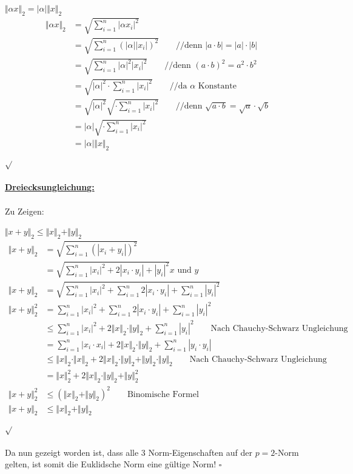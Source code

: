 \documentclass{llncs}
\begin{document}
$\Vert \alpha x \Vert_2=|\alpha | \Vert x \Vert_2$\\
\begin{align*}
\Vert\alpha x \Vert_2 
&=\sqrt{ \sum^n_{i=1} |\alpha x_i|^2}\\
&=\sqrt{ \sum^n_{i=1} (|\alpha| |x_i|)^2} \quad\quad\text{//denn  }|a\cdot b|=|a| \cdot |b| \\
&=\sqrt{ \sum^n_{i=1} |\alpha|^2 |x_i|^2}\quad\quad\text{//denn  }(a\cdot b)^2=a^2 \cdot b^2 \\
&=\sqrt{|\alpha|^2 \cdot \sum^n_{i=1} |x_i|^2}\quad\quad\text{//da }\alpha \text{ Konstante}\\
&=\sqrt{|\alpha|^2} \sqrt{\cdot \sum^n_{i=1} |x_i|^2}\quad\quad\text{//denn  } \sqrt{a\cdot b}=\sqrt{a} \cdot \sqrt{b} \\
&=|\alpha| \sqrt{\cdot \sum^n_{i=1} |x_i|^2}\\
&=|\alpha| \Vert x \Vert_2 
\end{align*} \hfill$\sqrt{}$\\\\
\underline{\textbf{Dreiecksungleichung:}}\\\\
Zu Zeigen:

$\Vert x+y \Vert_2\le\Vert x \Vert_2 + \Vert y \Vert_2$\\
\begin{align*}
\Vert x+y \Vert_2
&= \sqrt{ \sum^n_{i=1} (|x_i+y_i|)^2}\\
&=\sqrt{ \sum^n_{i=1} |x_i|^2+2| x_i\cdot y_i|+|y_i|^2}  x \text{ und } y \\
\Vert x+y \Vert_2&=\sqrt{ \sum^n_{i=1} |x_i|^2+\sum^n_{i=1}2| x_i\cdot y_i|+\sum^n_{i=1}|y_i|^2}\\
\Vert x+y \Vert_2^2
&=\sum^n_{i=1} |x_i|^2+\sum^n_{i=1}2| x_i\cdot y_i|+\sum^n_{i=1}|y_i|^2\\
&\le \sum^n_{i=1} |x_i|^2+2\Vert x \Vert_2\cdot\Vert y \Vert_2+\sum^n_{i=1}|y_i|^2 \quad\quad \text{Nach Chauchy-Schwarz Ungleichung}\\
&=\sum^n_{i=1} |x_i \cdot x_i|+2\Vert x \Vert_2\cdot\Vert y \Vert_2+\sum^n_{i=1}|y_i \cdot y_i|\\
&\le   \Vert x \Vert_2\cdot\Vert x \Vert_2+2\Vert x \Vert_2\cdot\Vert y \Vert_2+\Vert y \Vert_2\cdot\Vert y \Vert_2 \quad\quad \text{Nach Chauchy-Schwarz Ungleichung}\\
&=\Vert x \Vert_2^2+2\Vert x \Vert_2\cdot\Vert y \Vert_2+\Vert y \Vert_2^2 \\
\Vert x+y \Vert_2^2&\le(\Vert x \Vert_2+\Vert y \Vert_2)^2  \quad\quad \text{Binomische Formel}\\
\Vert x+y \Vert_2&\le\Vert x \Vert_2+\Vert y \Vert_2
\end{align*} \hfill$\sqrt{}$\\\\
Da nun gezeigt worden ist, dass alle 3 Norm-Eigenschaften auf der $p=2$-Norm gelten, ist somit die Euklidsche Norm eine gültige Norm! 
\hfill$\square$ 
\newpage
\end{document}
